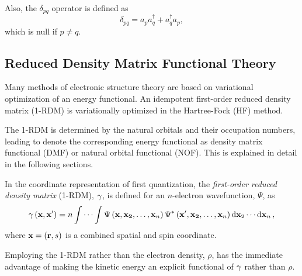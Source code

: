 Also, the $\delta_{pq}$ operator is defined as
\begin{equation}
    \delta_{pq} = a_p a_q^{\dagger} + a_q^{\dagger} a_p
    ,
\end{equation} 
which is null if $p \not= q$.


\subsection{Reduced Density Matrix Functional Theory} %

Many methods of electronic structure theory are based on variational
optimization of an energy functional.
An idempotent first-order reduced density matrix (1-RDM) is variationally
optimized in the Hartree-Fock (HF) method.

The 1-RDM is determined by the natural orbitals and their occupation
numbers, leading to denote the corresponding energy
functional as density matrix functional (DMF) or natural orbital functional (NOF).
This is explained in detail in the following sections.


In the coordinate representation of first quantization,
the \textit{first-order reduced density matrix} (1-RDM), $\gamma$, is defined
for an $n$-electron wavefunction, $\Psi$, as
\begin{equation} \label{eq:fordm-coordinate-representation}
    \gamma \left( \boldsymbol{\mathrm{x}}, \boldsymbol{\mathrm{x}}^{\prime} \right) =
    n \idotsint
    \Psi \left( \boldsymbol{\mathrm{x}}, \boldsymbol{\mathrm{x_2}}, \ldots,  \boldsymbol{\mathrm{x}}_n \right)
    \Psi^{*} \left( \boldsymbol{\mathrm{x}}^{\prime}, \boldsymbol{\mathrm{x_2}}, \ldots,  \boldsymbol{\mathrm{x}}_n \right)
    \dd{ \boldsymbol{\mathrm{x}}_2} \cdots \dd{ \boldsymbol{\mathrm{x}}_n}
    ,
\end{equation}
where $ \boldsymbol{\mathrm{x}} = \left( \boldsymbol{\mathrm{r}}, s \right)$ is a combined spatial and spin
coordinate.


Employing the 1-RDM rather than the electron density, $\rho$, has the immediate
advantage of making the kinetic energy an explicit functional of $\gamma$ rather
than $\rho$.

